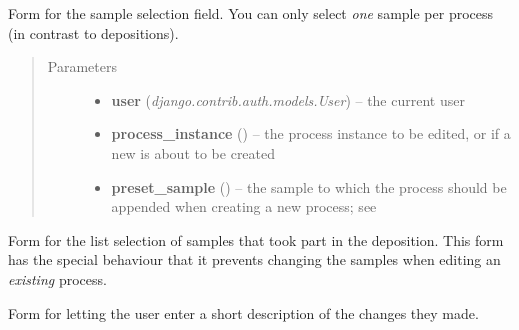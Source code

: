 \documentclass[a4paper,11pt,english]{sphinxmanual}
\begin{document}
\begin{fulllineitems}
\label{programming/utilities:samples.utils.views.SampleSelectForm}
Form for the sample selection field.  You can only select \emph{one} sample
per process (in contrast to depositions).
\begin{quote}\begin{description}
\item[{Parameters}] \leavevmode\begin{itemize}
\item {} 
\textbf{user} (\emph{django.contrib.auth.models.User}) -- the current user

\item {} 
\textbf{process\_instance} () -- the process instance to be edited, or  if
a new is about to be created

\item {} 
\textbf{preset\_sample} () -- the sample to which the process should be
appended when creating a new process; see

\end{itemize}

\end{description}\end{quote}

\end{fulllineitems}


\begin{fulllineitems}
\label{programming/utilities:samples.utils.views.DepositionSamplesForm}
Form for the list selection of samples that took part in the deposition.
This form has the special behaviour that it prevents changing the samples
when editing an \emph{existing} process.

\end{fulllineitems}


\begin{fulllineitems}
\label{programming/utilities:samples.utils.views.EditDescriptionForm}
Form for letting the user enter a short description of the changes they
made.

\end{fulllineitems}
\end{document}
